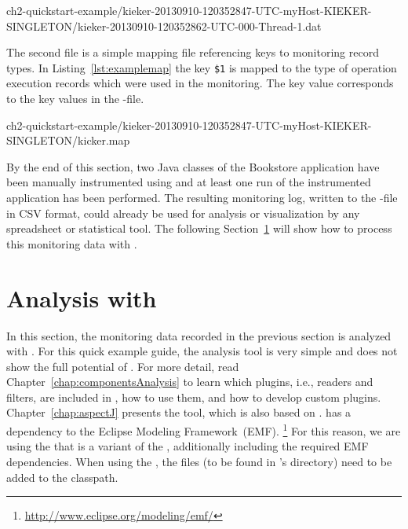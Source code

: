 \setBashListing
%
{ch2-quickstart-example/kieker-20130910-120352847-UTC-myHost-KIEKER-SINGLETON/kieker-20130910-120352862-UTC-000-Thread-1.dat}

\noindent The second file is a simple mapping file referencing keys to monitoring record types. In Listing~\ref{lst:examplemap} the key \verb!$1! is mapped to the type of operation execution records which were used in the monitoring. The key value corresponds to the key values in the -file.

%
{ch2-quickstart-example/kieker-20130910-120352847-UTC-myHost-KIEKER-SINGLETON/kicker.map}

\noindent By the end of this section, two Java classes of the Bookstore application %
have been manually instrumented using \KiekerMonitoringPart{} and at least one %
run of the instrumented application has been performed. %
The resulting monitoring log, written to the -file in CSV format, could %
already be used for analysis or visualization by any spreadsheet or %
statistical tool. %
The following Section~\ref{sec:example:analysis} will show how to process %
this monitoring data with \KiekerAnalysisPart{}.

\section{Analysis with \KiekerAnalysisPart{}}\label{sec:example:analysis}

In this section, the monitoring data recorded in the previous section is %
analyzed with \KiekerAnalysisPart{}. %
For this quick example guide, the analysis tool is very simple and does not show %
the full potential of \Kieker{}. For more detail, read %
Chapter~\ref{chap:componentsAnalysis} to learn which plugins, i.e., readers %
and filters, are included in \Kieker{}, how to use them, and how to develop %
custom plugins. %
Chapter~\ref{chap:aspectJ} presents the \KiekerTraceAnalysis{} tool, which %
is also based on \KiekerAnalysisPart{}.
\KiekerAnalysisPart{} has a dependency to the Eclipse Modeling Framework~(EMF).%
\footnote{\url{http://www.eclipse.org/modeling/emf/}} %
For this reason, we are using the \file{\mainJarEMF{}} that is a variant of %
the \file{\mainJar{}}, additionally including the required EMF dependencies. %
When using the \file{\mainJar{}}, the  files (to %
be found in \Kieker's  directory) need to be added to the classpath. %


